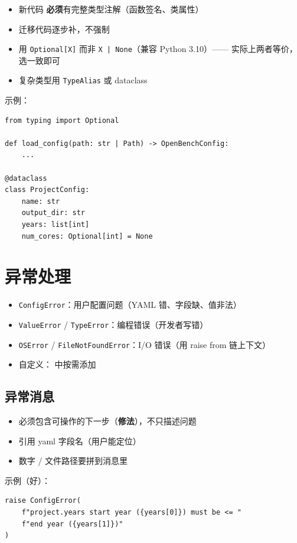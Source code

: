 \begin{itemize}
  \item 新代码 \textbf{必须}有完整类型注解（函数签名、类属性）
  \item 迁移代码逐步补，不强制
  \item 用 \texttt{Optional[X]} 而非 \texttt{X | None}（兼容 Python 3.10）—— 实际上两者等价，选一致即可
  \item 复杂类型用 \texttt{TypeAlias} 或 dataclass
\end{itemize}

示例：

\begin{verbatim}
from typing import Optional

def load_config(path: str | Path) -> OpenBenchConfig:
    ...

@dataclass
class ProjectConfig:
    name: str
    output_dir: str
    years: list[int]
    num_cores: Optional[int] = None
\end{verbatim}

\section{异常处理}

\begin{itemize}
  \item \texttt{ConfigError}：用户配置问题（YAML 错、字段缺、值非法）
  \item \texttt{ValueError} / \texttt{TypeError}：编程错误（开发者写错）
  \item \texttt{OSError} / \texttt{FileNotFoundError}：I/O 错误（用 raise from 链上下文）
  \item 自定义： 中按需添加
\end{itemize}

\subsection{异常消息}

\begin{itemize}
  \item 必须包含可操作的下一步（\textbf{修法}），不只描述问题
  \item 引用 yaml 字段名（用户能定位）
  \item 数字 / 文件路径要拼到消息里
\end{itemize}

示例（好）：

\begin{verbatim}
raise ConfigError(
    f"project.years start year ({years[0]}) must be <= "
    f"end year ({years[1]})"
)
\end{verbatim}

